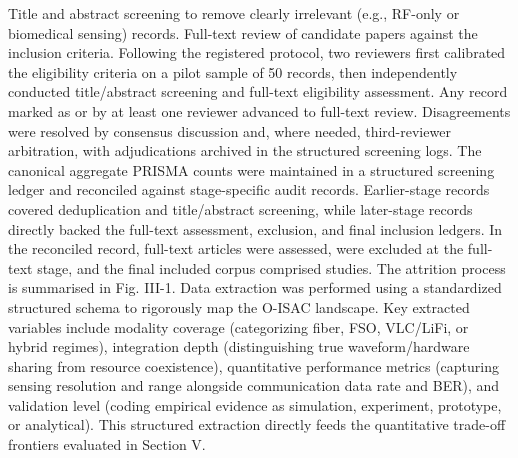  Title and abstract screening to remove clearly irrelevant (e.g., RF-only or biomedical sensing) records.\markdownRendererOlItemEnd 
{} Full-text review of candidate papers against the inclusion criteria.\markdownRendererOlItemEnd 
\markdownRendererOlEndTight \markdownRendererInterblockSeparator
{}Following the registered protocol, two reviewers first calibrated the eligibility criteria on a pilot sample of 50 records, then independently conducted title/abstract screening and full-text eligibility assessment. Any record marked as  or  by at least one reviewer advanced to full-text review. Disagreements were resolved by consensus discussion and, where needed, third-reviewer arbitration, with adjudications archived in the structured screening logs.\markdownRendererParagraphSeparator
{}The canonical aggregate PRISMA counts were maintained in a structured screening ledger and reconciled against stage-specific audit records. Earlier-stage records covered deduplication and title/abstract screening, while later-stage records directly backed the full-text assessment, exclusion, and final inclusion ledgers. In the reconciled record,  full-text articles were assessed,  were excluded at the full-text stage, and the final included corpus comprised  studies. The attrition process is summarised in Fig. III-1.\markdownRendererInterblockSeparator
{}\markdownRendererInterblockSeparator
{}\markdownRendererInterblockSeparator
{}
\markdownRendererSectionEnd \markdownRendererSectionBegin
{}\markdownRendererInterblockSeparator
{}Data extraction was performed using a standardized structured schema to rigorously map the O-ISAC landscape. Key extracted variables include modality coverage (categorizing fiber, FSO, VLC/LiFi, or hybrid regimes), integration depth (distinguishing true waveform/hardware sharing from resource coexistence), quantitative performance metrics (capturing sensing resolution and range alongside communication data rate and BER), and validation level (coding empirical evidence as simulation, experiment, prototype, or analytical). This structured extraction directly feeds the quantitative trade-off frontiers evaluated in Section V.\markdownRendererInterblockSeparator
